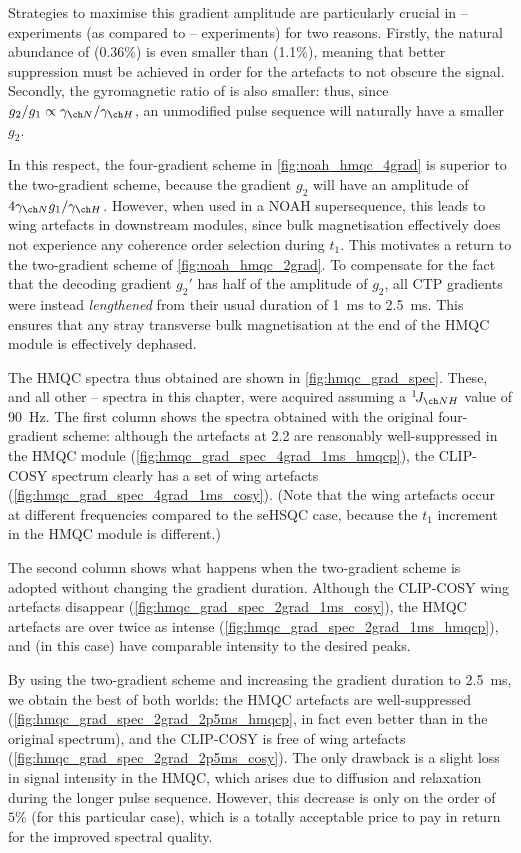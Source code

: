Strategies to maximise this gradient amplitude are particularly crucial in \proton{}--\nitrogen{} experiments (as compared to \proton{}--\carbon{} experiments) for two reasons.
Firstly, the natural abundance of \nitrogen{} (0.36\%) is even smaller than \carbon{} (1.1\%), meaning that better suppression must be achieved in order for the artefacts to not obscure the signal.
Secondly, the gyromagnetic ratio of \nitrogen{} is also smaller: thus, since $g_2/g_1 \propto \gammaN/\gammaH$, an unmodified pulse sequence will naturally have a smaller $g_2$.

In this respect, the four-gradient scheme in \cref{fig:noah_hmqc_4grad} is superior to the two-gradient scheme, because the gradient $g_2$ will have an amplitude of $4\gammaN g_1/\gammaH$.
However, when used in a NOAH supersequence, this leads to wing artefacts in downstream modules, since bulk  magnetisation effectively does not experience any coherence order selection during $t_1$.
This motivates a return to the two-gradient scheme of \cref{fig:noah_hmqc_2grad}.
To compensate for the fact that the decoding gradient $g_2'$ has half of the amplitude of $g_2$, all CTP gradients were instead \textit{lengthened} from their usual duration of \qty{1}{\ms} to \qty{2.5}{\ms}.
This ensures that any stray transverse bulk magnetisation at the end of the HMQC module is effectively dephased.

The HMQC spectra thus obtained are shown in \cref{fig:hmqc_grad_spec}.
These, and all other \proton{}--\nitrogen{} spectra in this chapter, were acquired assuming a $\oneJ{NH}$ value of \qty{90}{\Hz}.
The first column shows the spectra obtained with the original four-gradient scheme: although the artefacts at \qty{2.2}{\ppm} are reasonably well-suppressed in the HMQC module (\cref{fig:hmqc_grad_spec_4grad_1ms_hmqcp}), the CLIP-COSY spectrum clearly has a set of wing artefacts (\cref{fig:hmqc_grad_spec_4grad_1ms_cosy}).
(Note that the wing artefacts occur at different frequencies compared to the \carbon{} seHSQC case, because the $t_1$ increment in the \nitrogen{} HMQC module is different.)

The second column shows what happens when the two-gradient scheme is adopted without changing the gradient duration.
Although the CLIP-COSY wing artefacts disappear (\cref{fig:hmqc_grad_spec_2grad_1ms_cosy}), the HMQC artefacts are over twice as intense (\cref{fig:hmqc_grad_spec_2grad_1ms_hmqcp}), and (in this case) have comparable intensity to the desired peaks.

By using the two-gradient scheme and increasing the gradient duration to \qty{2.5}{\ms}, we obtain the best of both worlds: the HMQC artefacts are well-suppressed (\cref{fig:hmqc_grad_spec_2grad_2p5ms_hmqcp}, in fact even better than in the original spectrum), and the CLIP-COSY is free of wing artefacts (\cref{fig:hmqc_grad_spec_2grad_2p5ms_cosy}).
The only drawback is a slight loss in signal intensity in the HMQC, which arises due to diffusion and relaxation during the longer pulse sequence.
However, this decrease is only on the order of $5\%$ (for this particular case), which is a totally acceptable price to pay in return for the improved spectral quality.

